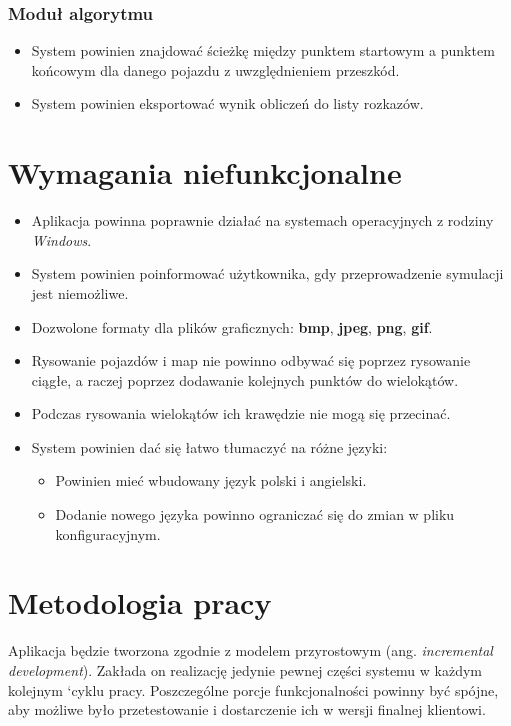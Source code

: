 \documentclass{article}
\let\oldsection\section
\renewcommand\section{\clearpage\oldsection} %
\begin{document}
\subsubsection{Moduł algorytmu}
\begin{itemize}
  \item System powinien znajdować ścieżkę między punktem startowym a punktem końcowym dla danego pojazdu z uwzględnieniem przeszkód.
  \item System powinien eksportować wynik obliczeń do listy rozkazów.
\end{itemize}


\section{Wymagania niefunkcjonalne}

\begin{itemize}
  \item Aplikacja powinna poprawnie działać na systemach operacyjnych z rodziny \textit{Windows}.
  \item System powinien poinformować użytkownika, gdy przeprowadzenie symulacji jest niemożliwe.
  \item Dozwolone formaty dla plików graficznych: \textbf{bmp}, \textbf{jpeg}, \textbf{png}, \textbf{gif}.
  \item Rysowanie pojazdów i map nie powinno odbywać się poprzez rysowanie ciągłe, a raczej poprzez dodawanie kolejnych punktów do wielokątów.
  \item Podczas rysowania wielokątów ich krawędzie nie mogą się przecinać. 
  \item System powinien dać się łatwo tłumaczyć na różne języki:
  \begin{itemize}
    \item Powinien mieć wbudowany język polski i angielski.
    \item Dodanie nowego języka powinno ograniczać się do zmian w pliku konfiguracyjnym.
  \end{itemize}
\end{itemize}


\section{Metodologia pracy}

Aplikacja będzie tworzona zgodnie z modelem przyrostowym (ang. \textit{incremental development}). Zakłada on realizację jedynie pewnej części systemu w każdym kolejnym `cyklu pracy. Poszczególne porcje funkcjonalności powinny być spójne, aby możliwe było przetestowanie i dostarczenie ich w wersji finalnej klientowi.
\end{document}

